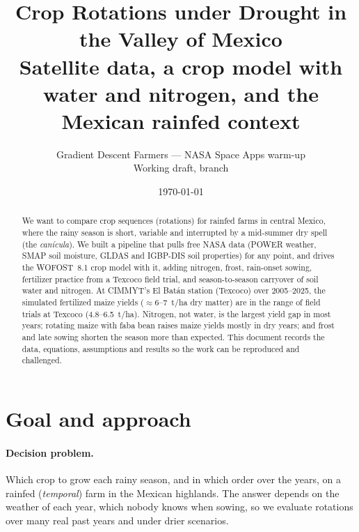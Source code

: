 \documentclass[11pt,a4paper]{article}
\title{Crop Rotations under Drought in the Valley of Mexico\\[0.3em]
\large Satellite data, a crop model with water and nitrogen, and the Mexican rainfed context}
\author{Gradient Descent Farmers --- NASA Space Apps warm-up\\
\small Working draft, branch \code{isaac/exploratory}}
\date{\today}
\begin{document}
\maketitle


\begin{abstract}
We want to compare crop sequences (rotations) for rainfed farms in central Mexico, where the rainy season is short,
variable and interrupted by a mid-summer dry spell (the \emph{canícula}). We built a pipeline that pulls free NASA
data (POWER weather, SMAP soil moisture, GLDAS and IGBP-DIS soil properties) for any point, and drives the WOFOST~8.1
crop model with it, adding nitrogen, frost, rain-onset sowing, fertilizer practice from a Texcoco field trial, and
season-to-season carryover of soil water and nitrogen. At CIMMYT's El Batán station (Texcoco) over 2005--2025, the
simulated fertilized maize yields (\(\approx\)6--7~t/ha dry matter) are in the range of field trials at Texcoco
(4.8--6.5~t/ha). Nitrogen, not water, is the largest yield gap in most years; rotating maize with faba bean raises maize
yields mostly in dry years; and frost and late sowing shorten the season more than expected. This document records the
data, equations, assumptions and results so the work can be reproduced and challenged.
\end{abstract}

\tableofcontents

\section{Goal and approach}

\paragraph{Decision problem.} Which crop to grow each rainy season, and in which order over the years, on a rainfed
(\emph{temporal}) farm in the Mexican highlands. The answer depends on the weather of each year, which nobody knows
when sowing, so we evaluate rotations over many real past years and under drier scenarios.
\end{document}
